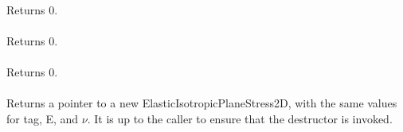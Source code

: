  \\
Returns $0$. \\

 \\
Returns $0$. \\

 \\
Returns $0$. \\

 \\
Returns a pointer to a new ElasticIsotropicPlaneStress2D, with the
same values for \p tag, \p E, and $\nu$. It is up to the
caller to ensure that the destructor is invoked. \\
